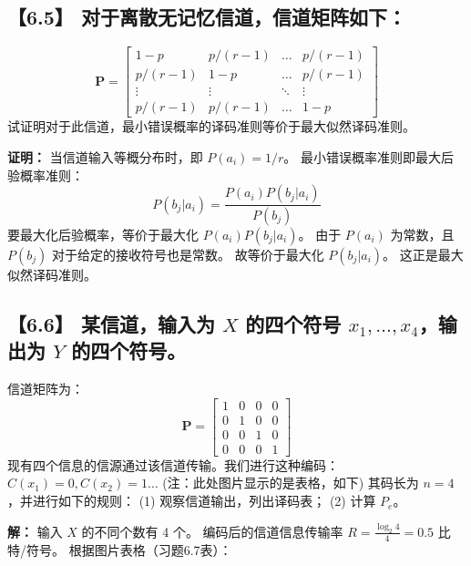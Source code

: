 \documentclass[11pt, a4paper]{article}
\begin{document}
\subsection*{【6.5】 对于离散无记忆信道，信道矩阵如下：}
\[
\mathbf{P} = \begin{bmatrix}
1-p & p/(r-1) & \dots & p/(r-1) \\
p/(r-1) & 1-p & \dots & p/(r-1) \\
\vdots & \vdots & \ddots & \vdots \\
p/(r-1) & p/(r-1) & \dots & 1-p
\end{bmatrix}
\]
试证明对于此信道，最小错误概率的译码准则等价于最大似然译码准则。

\textbf{证明：}
当信道输入等概分布时，即 $P(a_i) = 1/r$。
最小错误概率准则即最大后验概率准则：
\[ P(b_j|a_i) = \frac{P(a_i)P(b_j|a_i)}{P(b_j)} \]
要最大化后验概率，等价于最大化 $P(a_i)P(b_j|a_i)$。
由于 $P(a_i)$ 为常数，且 $P(b_j)$ 对于给定的接收符号也是常数。
故等价于最大化 $P(b_j|a_i)$。
这正是最大似然译码准则。

\subsection*{【6.6】 某信道，输入为 $X$ 的四个符号 $x_1, \dots, x_4$，输出为 $Y$ 的四个符号。}
信道矩阵为：
\[
\mathbf{P} = \begin{bmatrix}
1 & 0 & 0 & 0 \\
0 & 1 & 0 & 0 \\
0 & 0 & 1 & 0 \\
0 & 0 & 0 & 1
\end{bmatrix}
\]
现有四个信息的信源通过该信道传输。我们进行这种编码：
$C(x_1)=0, C(x_2)=1 \dots$ (注：此处图片显示的是表格，如下)
其码长为 $n=4$，并进行如下的规则：
(1) 观察信道输出，列出译码表；
(2) 计算 $P_e$。

\textbf{解：}
输入 $X$ 的不同个数有 4 个。
编码后的信道信息传输率 $R = \frac{\log_2 4}{4} = 0.5$ 比特/符号。
根据图片表格（习题6.7表）：
\end{document}
